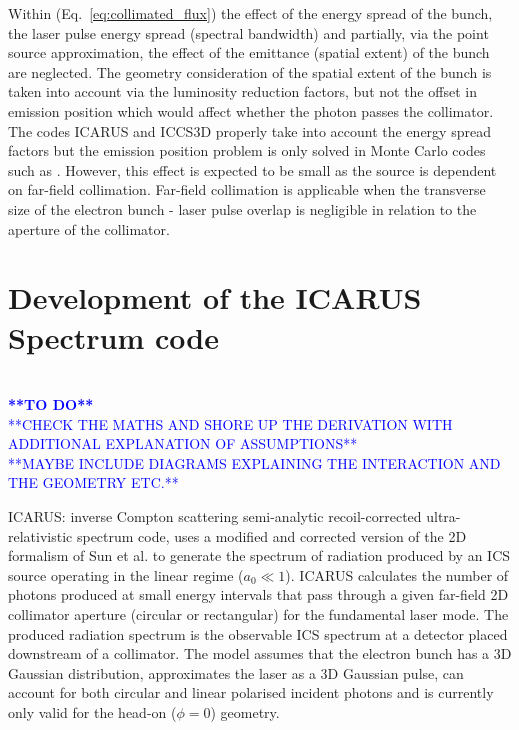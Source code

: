 \documentclass[../main.tex]{subfiles}
\begin{document}
Within (Eq.~\ref{eq:collimated_flux}) the effect of the energy spread of the bunch, the laser pulse energy spread (spectral bandwidth) and partially, via the point source approximation, the effect of the emittance (spatial extent) of the bunch are neglected. The geometry consideration of the spatial extent of the bunch is taken into account via the luminosity reduction factors, but not the offset in emission position which would affect whether the photon passes the collimator. The codes \textsc{ICARUS} and \textsc{ICCS3D} \cite{krafft2016laser,ranjan2018simulation} properly take into account the energy spread factors but the emission position problem is only solved in Monte Carlo codes such as  \cite{chen1995cain}. However, this effect is expected to be small as the source is dependent on far-field collimation. Far-field collimation is applicable when the transverse size of the electron bunch - laser pulse overlap is negligible in relation to the aperture of the collimator. 

\section{Development of the ICARUS Spectrum code}
\label{sec:development_of_the_ICARUS_spectrum_code}

\textcolor{blue}{\\\textbf{**TO DO**}\\ **CHECK THE MATHS AND SHORE UP THE DERIVATION WITH ADDITIONAL EXPLANATION OF ASSUMPTIONS**\\ **MAYBE INCLUDE DIAGRAMS EXPLAINING THE INTERACTION AND THE GEOMETRY ETC.**}  

\textsc{ICARUS}: inverse Compton scattering semi-analytic recoil-corrected ultra-relativistic spectrum code, uses a modified and corrected  version of the 2D formalism of Sun et al. \cite{sun2009characterizations,sun2011theoretical} to generate the spectrum of radiation produced by an ICS source operating in the linear regime ($a_{0}\ll 1$). \textsc{ICARUS} calculates the number of photons produced at small energy intervals that pass through a given far-field 2D collimator aperture (circular or rectangular) for the fundamental laser mode. The produced radiation spectrum is the observable ICS spectrum at a detector placed downstream of a collimator. The model assumes that the electron bunch has a 3D Gaussian distribution, approximates the laser as a 3D Gaussian pulse, can account for both circular and linear polarised incident photons and is currently only valid for the head-on ($\phi = 0$) geometry.
\end{document}
